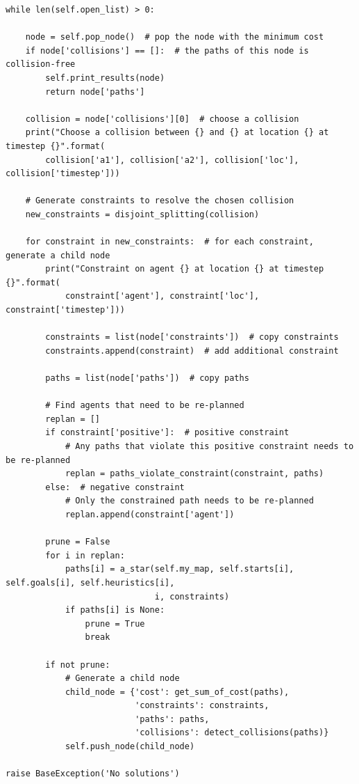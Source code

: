 \documentclass[11pt]{article}
\begin{document}
\begin{verbatim}
while len(self.open_list) > 0:

    node = self.pop_node()  # pop the node with the minimum cost
    if node['collisions'] == []:  # the paths of this node is collision-free
        self.print_results(node)
        return node['paths']

    collision = node['collisions'][0]  # choose a collision
    print("Choose a collision between {} and {} at location {} at timestep {}".format(
        collision['a1'], collision['a2'], collision['loc'], collision['timestep']))

    # Generate constraints to resolve the chosen collision
    new_constraints = disjoint_splitting(collision)

    for constraint in new_constraints:  # for each constraint, generate a child node
        print("Constraint on agent {} at location {} at timestep {}".format(
            constraint['agent'], constraint['loc'], constraint['timestep']))

        constraints = list(node['constraints'])  # copy constraints
        constraints.append(constraint)  # add additional constraint

        paths = list(node['paths'])  # copy paths

        # Find agents that need to be re-planned
        replan = []
        if constraint['positive']:  # positive constraint
            # Any paths that violate this positive constraint needs to be re-planned
            replan = paths_violate_constraint(constraint, paths)
        else:  # negative constraint
            # Only the constrained path needs to be re-planned
            replan.append(constraint['agent'])

        prune = False
        for i in replan:
            paths[i] = a_star(self.my_map, self.starts[i], self.goals[i], self.heuristics[i],
                              i, constraints)
            if paths[i] is None:
                prune = True
                break

        if not prune:
            # Generate a child node
            child_node = {'cost': get_sum_of_cost(paths),
                          'constraints': constraints,
                          'paths': paths,
                          'collisions': detect_collisions(paths)}
            self.push_node(child_node)
            
raise BaseException('No solutions')
\end{verbatim}
\end{document}
